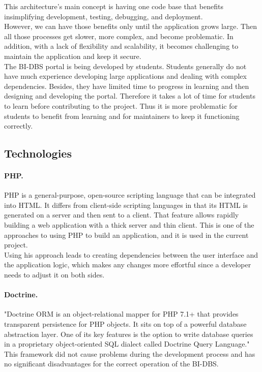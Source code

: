 \noindent This architecture's main concept is having one code base that benefits in\newline simplifying development, testing, debugging, and deployment.\\
However, we can have those benefits only until the application grows large. Then all those processes get slower, more complex, and become problematic. In addition, with a lack of flexibility and scalability, it becomes challenging to maintain the application and keep it secure.\\

\noindent The BI-DBS portal is being developed by students. Students generally do not have much experience developing large applications and dealing with complex dependencies. Besides, they have limited time to progress in learning and then designing and developing the portal. Therefore it takes a lot of time for students to learn before contributing to the project. Thus it is more problematic for students to benefit from learning and for maintainers to keep it functioning correctly.




\subsection{Technologies}
\paragraph*{PHP.} PHP is a general-purpose, open-source scripting language that can be integrated into HTML.\cite{php-doc}\cite{html-doc} It differs from client-side scripting languages in that its HTML is generated on a server and then sent to a client. That feature allows rapidly building a web application with a thick server and thin client. This is one of the approaches to using PHP to build an application, and it is used in the current project. \\
Using his approach leads to creating dependencies between the user interface and the application logic, which makes any changes more effortful since a developer needs to adjust it on both sides.

\paragraph*{Doctrine.} "Doctrine ORM is an object-relational mapper for PHP 7.1+ that provides transparent persistence for PHP objects. It sits on top of a powerful database abstraction layer. One of its key features is the option to write database queries in a proprietary object-oriented SQL dialect called Doctrine Query Language."\cite{doctrine-doc}\\ 
This framework did not cause problems during the development process and has no significant disadvantages for the correct operation of the BI-DBS.

